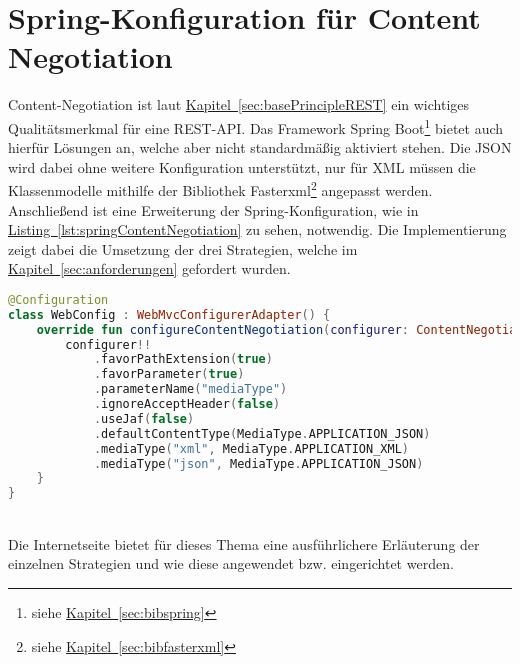 \section{Spring-Konfiguration für Content Negotiation}\label{sec:contentNegotiation}
Content-Negotiation ist laut \hyperref[sec:basePrincipleREST]{Kapitel~\ref{sec:basePrincipleREST}} ein wichtiges Qualitätsmerkmal für eine \gls{REST}-\gls{API}. Das Framework Spring Boot\footnote{siehe \hyperref[sec:bibspring]{Kapitel~\ref{sec:bibspring}}} bietet auch hierfür Lösungen an, welche aber nicht standardmäßig aktiviert stehen. Die \gls{JSON} wird dabei ohne weitere Konfiguration unterstützt, nur für \gls{XML} müssen die Klassenmodelle mithilfe der Bibliothek Fasterxml\footnote{siehe \hyperref[sec:bibfasterxml]{Kapitel~\ref{sec:bibfasterxml}}} angepasst werden. Anschließend ist eine Erweiterung der Spring-Konfiguration, wie in \hyperref[lst:springContentNegotiation]{Listing~\ref{lst:springContentNegotiation}} zu sehen, notwendig. Die Implementierung zeigt dabei die Umsetzung der drei Strategien, welche im \hyperref[sec:anforderungen]{Kapitel~\ref{sec:anforderungen}} gefordert wurden.
\\
\begin{lstlisting}[style=lstStyleFramed, language=Kotlin, caption={Spring-Konfiguration der drei Strategien für Content Negotiation}, label=lst:springContentNegotiation, float]
@Configuration
class WebConfig : WebMvcConfigurerAdapter() {
	override fun configureContentNegotiation(configurer: ContentNegotiationConfigurer?) {
		configurer!!
			.favorPathExtension(true)
			.favorParameter(true)
			.parameterName("mediaType")
			.ignoreAcceptHeader(false)
			.useJaf(false)
			.defaultContentType(MediaType.APPLICATION_JSON)
			.mediaType("xml", MediaType.APPLICATION_XML)
			.mediaType("json", MediaType.APPLICATION_JSON)
	}
}
\end{lstlisting}
\\
Die Internetseite \cite{springContentNegotiation} bietet für dieses Thema eine ausführlichere Erläuterung der einzelnen Strategien und wie diese angewendet bzw. eingerichtet werden.


